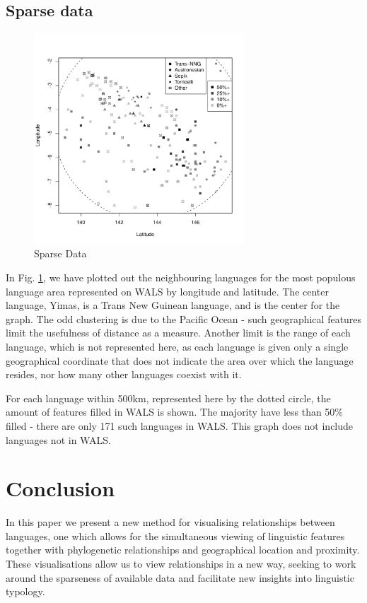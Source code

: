 \documentclass[11pt]{article}
\begin{document}
\subsection{Sparse data}


\begin{figure}[h]
\includegraphics[width=3.1in]
{graph1sparse.pdf} 
\caption{Sparse Data} 
\label{fig:sparse} 
\end{figure}

In Fig. \ref{fig:sparse}, we have plotted out the neighbouring languages for the most populous language area represented on WALS by longitude and latitude. The center language, Yimas, is a Trans New Guinean language, and is the center for the graph. The odd clustering is due to the Pacific Ocean - such geographical features limit the usefulness of distance as a measure. Another limit is the range of each language, which is not represented here, as each language is given only a single geographical coordinate that does not indicate the area over which the language resides, nor how many other languages coexist with it.

For each language within 500km, represented here by the dotted circle, the amount of features filled in WALS is shown. The majority have less than 50\% filled - there are only 171 such languages in WALS. This graph does not include languages not in WALS. 


\section{Conclusion}
In this paper we present a new method for visualising relationships between languages, one which allows for the simultaneous viewing of linguistic features together with phylogenetic relationships and geographical location and proximity.
These visualisations allow us to view relationships in a new way, seeking to work around the sparseness of available data and facilitate new insights into linguistic typology.
\end{document}
